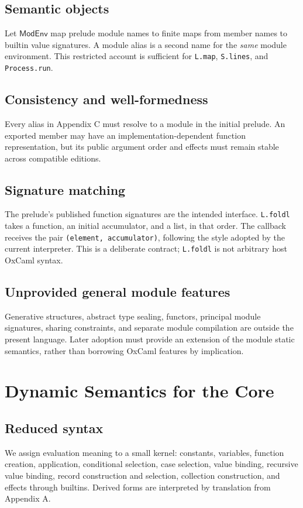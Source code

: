 \documentclass[11pt,oneside,openany]{book}
\newcommand{\kw}[1]{\texttt{#1}}
\begin{document}
\section{Semantic objects}
Let $\mathsf{ModEnv}$ map prelude module names to finite maps from member names to builtin value signatures. A module alias is a second name for the \emph{same} module environment. This restricted account is sufficient for \kw{L.map}, \kw{S.lines}, and \kw{Process.run}.

\section{Consistency and well-formedness}
Every alias in Appendix C must resolve to a module in the initial prelude. An exported member may have an implementation-dependent function representation, but its public argument order and effects must remain stable across compatible editions.

\section{Signature matching}
The prelude's published function signatures are the intended interface. \kw{L.foldl} takes a function, an initial accumulator, and a list, in that order. The callback receives the pair \kw{(element, accumulator)}, following the style adopted by the current interpreter. This is a deliberate contract; \kw{L.foldl} is not arbitrary host OxCaml syntax.

\section{Unprovided general module features}
Generative structures, abstract type sealing, functors, principal module signatures, sharing constraints, and separate module compilation are outside the present language. Later adoption must provide an extension of the module static semantics, rather than borrowing OxCaml features by implication.

\chapter{Dynamic Semantics for the Core}
\section{Reduced syntax}
We assign evaluation meaning to a small kernel: constants, variables, function creation, application, conditional selection, case selection, value binding, recursive value binding, record construction and selection, collection construction, and effects through builtins. Derived forms are interpreted by translation from Appendix A.
\end{document}
